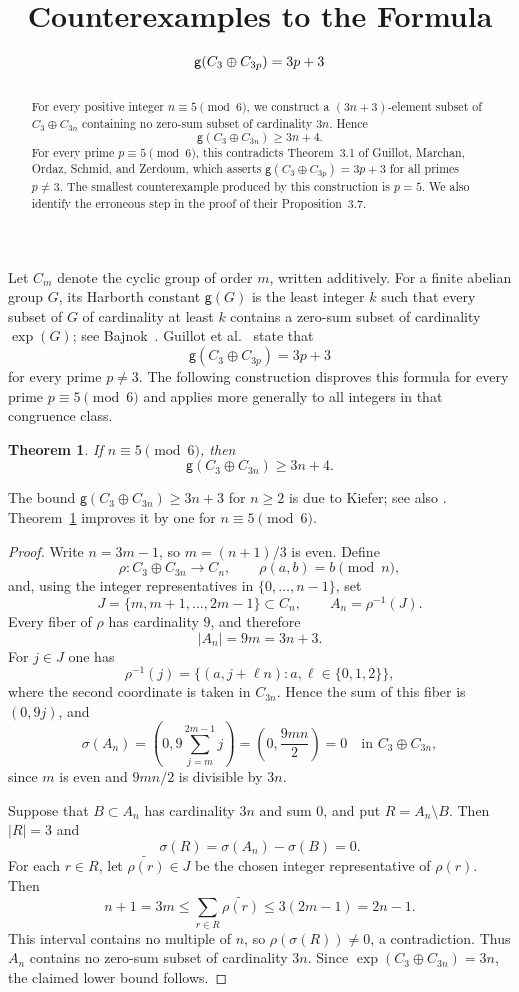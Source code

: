 \documentclass[11pt]{amsart}
\title[Counterexamples to a Harborth formula]
{Counterexamples to the Formula
\texorpdfstring{$\gH(C_3\oplus C_{3p})=3p+3$}
{g(C3 plus C3p) = 3p + 3}}
\date{}
\newtheorem{theorem}{Theorem}
\theoremstyle{remark}
\newcommand{\gH}{\mathsf{g}}
\begin{document}
\begin{abstract}
For every positive integer $n\equiv5\pmod6$, we construct a
$(3n+3)$-element subset of $C_3\oplus C_{3n}$ containing no zero-sum
subset of cardinality $3n$. Hence
\[
  \gH(C_3\oplus C_{3n})\ge 3n+4.
\]
For every prime $p\equiv5\pmod6$, this contradicts Theorem~3.1 of
Guillot, Marchan, Ordaz, Schmid, and Zerdoum, which asserts
$\gH(C_3\oplus C_{3p})=3p+3$ for all primes $p\ne3$.
The smallest counterexample produced by this construction is $p=5$. We
also identify the erroneous step in the proof of their
Proposition~3.7.
\end{abstract}

\maketitle

Let $C_m$ denote the cyclic group of order $m$, written additively.
For a finite abelian group $G$, its Harborth constant $\gH(G)$ is the
least integer $k$ such that every subset of $G$ of cardinality at least
$k$ contains a zero-sum subset of cardinality $\exp(G)$; see
Bajnok~\cite[Chapter~F.3]{Bajnok}. Guillot et
al.~\cite[Theorem~3.1]{GuillotEtAl} state that
\[
  \gH(C_3\oplus C_{3p})=3p+3
\]
for every prime $p\ne3$. The following construction disproves this
formula for every prime $p\equiv5\pmod6$ and applies more generally to
all integers in that congruence class.

\begin{theorem}\label{thm:main}
If $n\equiv5\pmod6$, then
\[
  \gH(C_3\oplus C_{3n})\ge 3n+4.
\]
\end{theorem}

The bound $\gH(C_3\oplus C_{3n})\ge3n+3$ for $n\ge2$ is due to Kiefer;
see also \cite[Prop.~F.104]{Bajnok}. Theorem~\ref{thm:main} improves it
by one for $n\equiv5\pmod6$.

\begin{proof}
Write $n=3m-1$, so $m=(n+1)/3$ is even. Define
\[
  \rho:C_3\oplus C_{3n}\longrightarrow C_n,
  \qquad \rho(a,b)=b\pmod n,
\]
and, using the integer representatives in $\{0,\ldots,n-1\}$, set
\[
  J=\{m,m+1,\ldots,2m-1\}\subset C_n,
  \qquad A_n=\rho^{-1}(J).
\]
Every fiber of $\rho$ has cardinality $9$, and therefore
\[
  |A_n|=9m=3n+3.
\]
For $j\in J$ one has
\[
  \rho^{-1}(j)
  =\{(a,j+\ell n):a,\ell\in\{0,1,2\}\},
\]
where the second coordinate is taken in $C_{3n}$. Hence the sum of this
fiber is $(0,9j)$, and
\[
  \sigma(A_n)
  =\left(0,9\sum_{j=m}^{2m-1}j\right)
  =\left(0,\frac{9mn}{2}\right)
  =0
  \quad\text{in }C_3\oplus C_{3n},
\]
since $m$ is even and $9mn/2$ is divisible by $3n$.

Suppose that $B\subset A_n$ has cardinality $3n$ and sum $0$, and put
$R=A_n\setminus B$. Then $|R|=3$ and
\[
  \sigma(R)=\sigma(A_n)-\sigma(B)=0.
\]
For each $r\in R$, let $\widetilde{\rho(r)}\in J$ be the chosen integer
representative of $\rho(r)$. Then
\[
  n+1=3m
  \le \sum_{r\in R}\widetilde{\rho(r)}
  \le 3(2m-1)=2n-1.
\]
This interval contains no multiple of $n$, so
$\rho(\sigma(R))\ne0$, a contradiction. Thus $A_n$ contains no
zero-sum subset of cardinality $3n$. Since
$\exp(C_3\oplus C_{3n})=3n$, the claimed lower bound follows.
\end{proof}
\end{document}
